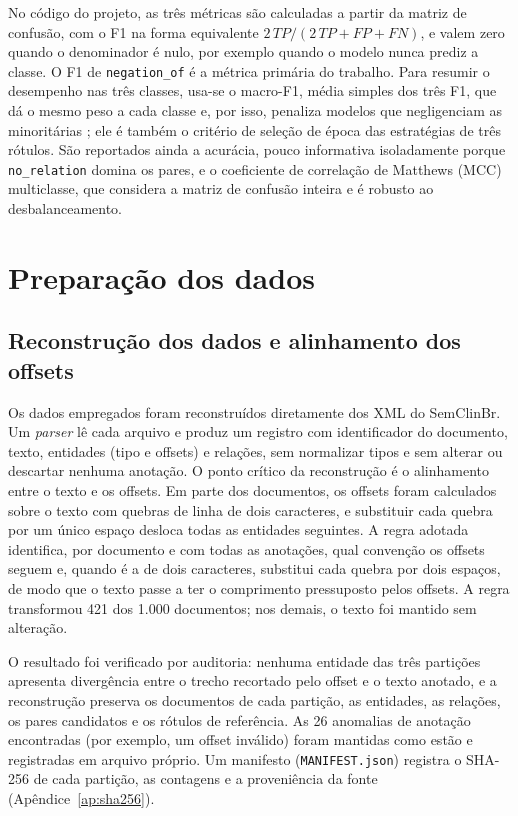 No código do projeto, as três métricas são calculadas a partir da matriz de confusão,
com o F1 na forma equivalente $2\,TP/(2\,TP + FP + FN)$, e valem zero quando o
denominador é nulo, por exemplo quando o modelo nunca prediz a classe. O F1 de
\texttt{negation\_of} é a métrica primária do trabalho. Para resumir o
desempenho nas três classes, usa-se o macro-F1, média simples dos três F1,
que dá o mesmo peso a cada classe e, por isso, penaliza modelos que negligenciam as
minoritárias \cite{forman_2010_apples}; ele é também o critério de seleção de época
das estratégias de três rótulos. São reportados ainda a acurácia, pouco informativa
isoladamente porque \texttt{no\_relation} domina os pares, e o coeficiente de
correlação de Matthews (MCC) multiclasse, que considera a matriz de confusão inteira e
é robusto ao desbalanceamento.

\section{Preparação dos dados}
\label{sec:preparacao}

\subsection{Reconstrução dos dados e alinhamento dos offsets}
\label{sec:parsing}

Os dados empregados foram reconstruídos diretamente dos XML do SemClinBr. Um
\emph{parser} lê cada arquivo e produz um registro com identificador do documento,
texto, entidades (tipo e offsets) e relações, sem normalizar tipos e sem alterar ou
descartar nenhuma anotação. O ponto crítico da reconstrução é o alinhamento entre o
texto e os offsets. Em parte dos documentos, os offsets foram calculados sobre o texto
com quebras de linha de dois caracteres, e substituir cada quebra por um único espaço
desloca todas as entidades seguintes. A regra adotada identifica, por documento e com
todas as anotações, qual convenção os offsets seguem e, quando é a de dois caracteres,
substitui cada quebra por dois espaços, de modo que o texto passe a ter o comprimento
pressuposto pelos offsets. A regra transformou 421 dos 1.000 documentos; nos demais, o
texto foi mantido sem alteração.

O resultado foi verificado por auditoria: nenhuma entidade das três partições
apresenta divergência entre o trecho recortado pelo offset e o texto anotado, e a
reconstrução preserva os documentos de cada partição, as entidades, as relações, os
pares candidatos e os rótulos de referência. As 26 anomalias de anotação encontradas
(por exemplo, um offset inválido) foram mantidas como estão e registradas em arquivo
próprio. Um manifesto (\texttt{MANIFEST.json}) registra o SHA-256 de cada partição,
as contagens e a proveniência da fonte (Apêndice~\ref{ap:sha256}).

